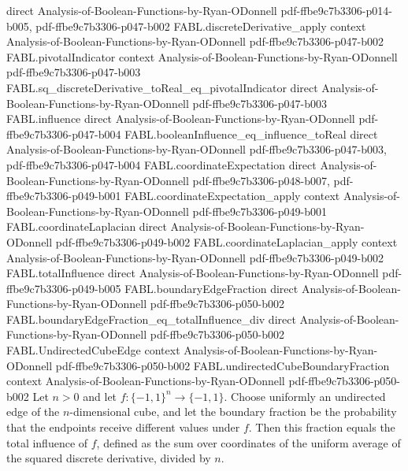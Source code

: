 \begin{theorem}
  {direct}
  {Analysis-of-Boolean-Functions-by-Ryan-ODonnell}
  {pdf-ffbe9c7b3306-p014-b005,
    pdf-ffbe9c7b3306-p047-b002}
\proofstep
  {FABL.discreteDerivative_apply}
  {context}
  {Analysis-of-Boolean-Functions-by-Ryan-ODonnell}
  {pdf-ffbe9c7b3306-p047-b002}
\proofstep
  {FABL.pivotalIndicator}
  {context}
  {Analysis-of-Boolean-Functions-by-Ryan-ODonnell}
  {pdf-ffbe9c7b3306-p047-b003}
\proofstep
  {FABL.sq_discreteDerivative_toReal_eq_pivotalIndicator}
  {direct}
  {Analysis-of-Boolean-Functions-by-Ryan-ODonnell}
  {pdf-ffbe9c7b3306-p047-b003}
\proofstep
  {FABL.influence}
  {direct}
  {Analysis-of-Boolean-Functions-by-Ryan-ODonnell}
  {pdf-ffbe9c7b3306-p047-b004}
\proofstep
  {FABL.booleanInfluence_eq_influence_toReal}
  {direct}
  {Analysis-of-Boolean-Functions-by-Ryan-ODonnell}
  {pdf-ffbe9c7b3306-p047-b003,
    pdf-ffbe9c7b3306-p047-b004}
\proofstep
  {FABL.coordinateExpectation}
  {direct}
  {Analysis-of-Boolean-Functions-by-Ryan-ODonnell}
  {pdf-ffbe9c7b3306-p048-b007,
    pdf-ffbe9c7b3306-p049-b001}
\proofstep
  {FABL.coordinateExpectation_apply}
  {context}
  {Analysis-of-Boolean-Functions-by-Ryan-ODonnell}
  {pdf-ffbe9c7b3306-p049-b001}
\proofstep
  {FABL.coordinateLaplacian}
  {direct}
  {Analysis-of-Boolean-Functions-by-Ryan-ODonnell}
  {pdf-ffbe9c7b3306-p049-b002}
\proofstep
  {FABL.coordinateLaplacian_apply}
  {context}
  {Analysis-of-Boolean-Functions-by-Ryan-ODonnell}
  {pdf-ffbe9c7b3306-p049-b002}
\proofstep
  {FABL.totalInfluence}
  {direct}
  {Analysis-of-Boolean-Functions-by-Ryan-ODonnell}
  {pdf-ffbe9c7b3306-p049-b005}
\proofstep
  {FABL.boundaryEdgeFraction}
  {direct}
  {Analysis-of-Boolean-Functions-by-Ryan-ODonnell}
  {pdf-ffbe9c7b3306-p050-b002}
\proofstep
  {FABL.boundaryEdgeFraction_eq_totalInfluence_div}
  {direct}
  {Analysis-of-Boolean-Functions-by-Ryan-ODonnell}
  {pdf-ffbe9c7b3306-p050-b002}
\proofstep
  {FABL.UndirectedCubeEdge}
  {context}
  {Analysis-of-Boolean-Functions-by-Ryan-ODonnell}
  {pdf-ffbe9c7b3306-p050-b002}
\proofstep
  {FABL.undirectedCubeBoundaryFraction}
  {context}
  {Analysis-of-Boolean-Functions-by-Ryan-ODonnell}
  {pdf-ffbe9c7b3306-p050-b002}
Let $n>0$ and let $f:\{-1,1\}^n\to\{-1,1\}$. Choose uniformly an undirected edge of the
$n$-dimensional cube, and let the boundary fraction be the probability that the
endpoints receive different values under $f$. Then this fraction equals the total
influence of $f$, defined as the sum over coordinates of the uniform average of the
squared discrete derivative, divided by $n$.
\end{theorem}

